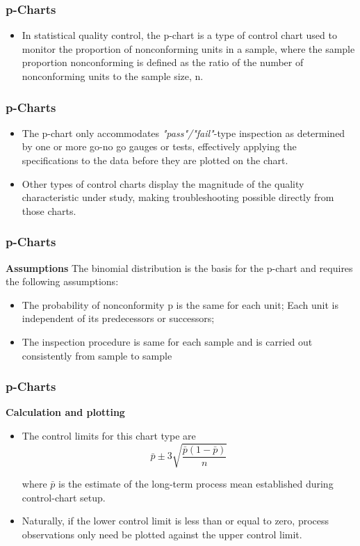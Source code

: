 \documentclass[Charts101.tex]{subfiles}
\begin{document}
	\begin{frame}
		\frametitle{p-Charts}	
		\large
		\begin{itemize}
			\item
In statistical quality control, the p-chart is a type of control chart used to monitor the proportion of nonconforming units in a sample, where the sample proportion nonconforming is defined as the ratio of the number of nonconforming units to the sample size, n.
\end{itemize}
\end{frame}
\begin{frame}
	\frametitle{p-Charts}
	\Large
\begin{itemize}
\item The p-chart only accommodates \textit{"pass"/"fail"}-type inspection as determined by one or more go-no go gauges or tests, effectively applying the specifications to the data before they are plotted on the chart. \item Other types of control charts display the magnitude of the quality characteristic under study, making troubleshooting possible directly from those charts.

\end{itemize}

\end{frame}
\begin{frame}
	\frametitle{p-Charts}
	\Large
\textbf{Assumptions}
The binomial distribution is the basis for the p-chart and requires the following assumptions:
\begin{itemize}


\item The probability of nonconformity p is the same for each unit;
Each unit is independent of its predecessors or successors;
\item The inspection procedure is same for each sample and is carried out consistently from sample to sample
\end{itemize}


\end{frame}
\begin{frame}
	\frametitle{p-Charts}
	\Large
\textbf{Calculation and plotting}\\
\begin{itemize}
\item The control limits for this chart type are \[\bar{p} \pm 3\sqrt{\frac{\bar{p}(1-\bar{p})}{n}} \]

where $\bar{p}$ is the estimate of the long-term process mean established during control-chart setup.
\item Naturally, if the lower control limit is less than or equal to zero, process observations only need be plotted against the upper control limit. 
\end{itemize}
\end{frame}
\end{document}

